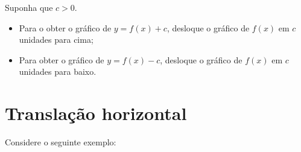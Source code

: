 \begin{obs}
Suponha que $c>0$.
\begin{itemize}
    \item Para o obter o gráfico de $y=f(x)+c$, desloque o gráfico de $f(x)$ em $c$ unidades para cima;
    \item Para obter o gráfico de $y=f(x)-c$, desloque o gráfico de $f(x)$ em $c$ unidades para baixo.
\end{itemize}
\end{obs}



 \section{Translação horizontal}

  Considere o seguinte exemplo:

